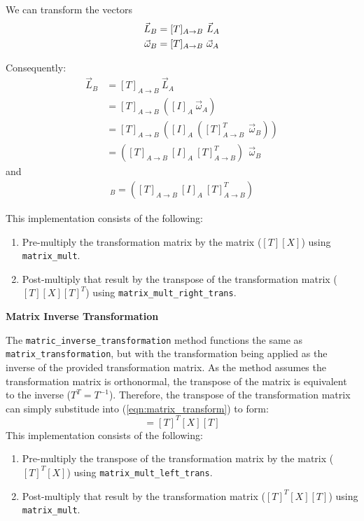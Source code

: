 \documentclass[11pt,fleqn]{report}
\begin{document}
We can transform the vectors
\begin{align*}
\vec L_B&= [T]_{A \rightarrow B}~ \vec L_A \\
\vec \omega_B &= [T]_{A \rightarrow B}~ \vec \omega_A \hfill
\end{align*}

Consequently:
\begin{align*}
\vec L_B &= [T]_{A \rightarrow B}~ \vec L_A \\
 &= [T]_{A \rightarrow B}~ ([I]_A~ \vec \omega_A) \\
 &= [T]_{A \rightarrow B}~ ([I]_A ~
([T]^T_{A \rightarrow B}~~ \vec \omega_B)) \\
 &= ([T]_{A \rightarrow B}~ [I]_A~ [T]^T_{A \rightarrow B})~~
\vec \omega_B
\end{align*}
and
\begin{align*}
[I]_B= ([T]_{A \rightarrow B}~ [I]_A~ [T]^T_{A \rightarrow B})
\end{align*}

This implementation consists of the following:
\begin{enumerate}
\item Pre-multiply the transformation matrix by the matrix ($[T][X]$) using 
\texttt{matrix\_mult}.
\item Post-multiply that result by the transpose of the transformation matrix
($[T][X][T]^T$) using \texttt{matrix\_mult\_right\_trans}.
\end{enumerate}

\textbf{Matrix Inverse Transformation}

The \texttt{matric\_inverse\_transformation} method functions
the same as \texttt{matrix\_transformation}, but with the transformation being
applied as the inverse of the provided transformation matrix.
As the method assumes the transformation matrix is orthonormal, the transpose
of the matrix is equivalent to the inverse ($T^T = T^{-1}$).
Therefore, the transpose of the transformation matrix can simply substitude into
(\ref{eqn:matrix_transform}) to form:
\begin{equation*}
[Y] = [T]^T[X][T]
\end{equation*}
This implementation consists of the following:
\begin{enumerate}
\item Pre-multiply the transpose of the transformation matrix by the
matrix ($[T]^T[X]$) using \texttt{matrix\_mult\_left\_trans}.
\item Post-multiply that result by the transformation matrix
($[T]^T[X][T]$) using \texttt{matrix\_mult}.
\end{enumerate}
\end{document}
